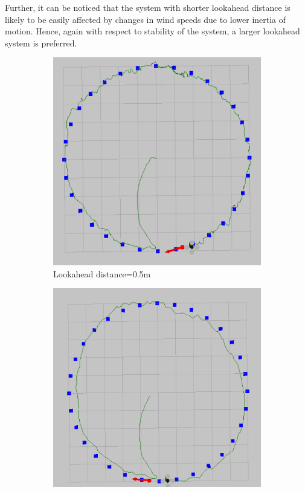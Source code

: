 \documentclass[hidelinks,BTech]{iitmdiss}
\begin{document}
Further, it can be noticed that the system with shorter lookahead distance is likely to be easily affected by changes in wind speeds due to lower inertia of motion. Hence, again with respect to stability of the system, a larger lookahead system is preferred.

\begin{figure}[H]
  \centering
  \begin{subfigure}[t]{0.48\textwidth}
    \centering
      \includegraphics[width=\textwidth]{Pure_Pursuit_0_5_payload_0_1_wind.png}
      \caption{Lookahead distance=0.5m}
  \end{subfigure}  \begin{subfigure}[t]{0.48\textwidth}
  \includegraphics[width=\textwidth]{Pure_Pursuit_1_payload_0_1_wind.png}

\end{subfigure}
\end{figure}
\end{document}
